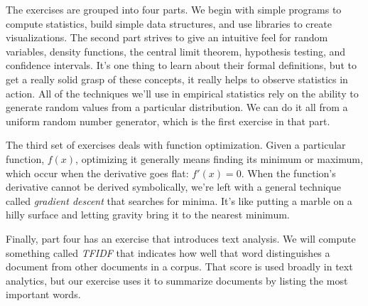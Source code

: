 {
}

The exercises are grouped into four parts. We begin with simple programs to compute statistics, build simple data structures, and use libraries to create visualizations. The second part strives to give an intuitive feel for random variables, density functions, the central limit theorem, hypothesis testing, and confidence intervals. It's one thing to learn about their formal definitions, but to get a really solid grasp of these concepts, it really helps to observe statistics in action. All of the techniques we'll use in empirical statistics rely on the ability to generate random values from a particular distribution. We can do it all from a uniform random number generator, which is the first exercise in that part.

The third set of exercises deals with function optimization. Given a particular function, $f(x)$, optimizing it generally means finding its minimum or maximum, which occur when the derivative goes flat: $f'(x) = 0$. When the function's derivative cannot be derived symbolically, we're left with a general technique called {\em gradient descent} that searches for minima. It's like putting a marble on a hilly surface and letting gravity bring it to the nearest minimum.


Finally, part four has an exercise that introduces text analysis. We will compute something called {\em TFIDF} that indicates how well that word distinguishes a document from other documents in a corpus.  That score is used broadly in text analytics, but our exercise uses it to summarize documents by listing the most important words.
